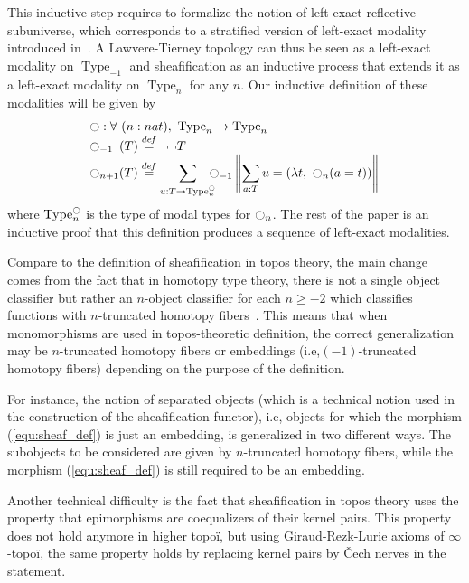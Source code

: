 \documentclass[preprint,9pt,numbers]{sigplanconf}
\newcommand \defeq {\overset{de\hspace{-0.2ex}f}{=}}
\newcommand{\ie}{i.e,\xspace}
\DeclareMathOperator{\Type}{Type}
\newcommand{\modal}{\ensuremath{\ocircle}}
\begin{document}
This inductive step requires to formalize the notion of left-exact
reflective subuniverse, which corresponds to a stratified version of
left-exact modality introduced in~\cite[Chapter~7]{hottbook}. A
Lawvere-Tierney topology can thus be seen as a left-exact modality on
$\Type_{-1}$ and sheafification as an inductive process that extends
it as a left-exact modality on $\Type_{n}$ for any $n$.
Our inductive definition of these modalities will be given by
\[ \begin{array}{l}
   \modal : \forall \ (n : nat), \ \Type_n \to \Type_n 
   \\
    \modal_{-1\phantom{n}}(T) \defeq\lnot\lnot T \\

      \displaystyle{\modal_{n+1}(T)} \defeq  
      \displaystyle{\sum_{u:T \to \Type_n^\modal} \!\!\!\!\modal_{-1} 
      \left\|
      \sum_{a:T} u= (\lambda t,~\modal_n (a=t))
      \right\|}
    \end{array}
\]
where $\Type_n^\modal$ is the type of modal types for $\modal_n$.
The rest of the paper is an inductive proof that this definition produces a
sequence of left-exact modalities.

Compare to the definition of sheafification in topos theory, the main
change comes from the fact that in homotopy type theory, there is not
a single object classifier but rather an $n$-object classifier for
each $n\geq -2$ which classifies functions with $n$-truncated homotopy
fibers~\cite{sets_in_hott}. This means that when monomorphisms are used in topos-theoretic definition, the correct generalization may be $n$-truncated homotopy
fibers or embeddings (\ie $(-1)$-truncated homotopy
fibers) depending on the purpose of the definition.

For instance, the notion of separated objects (which is a technical
notion used in the construction of the sheafification functor), \ie
objects for which the morphism
(\ref{equ:sheaf_def}) is just an embedding, is generalized in two
different ways.  
%
The subobjects to be considered are given by $n$-truncated homotopy fibers,
while the morphism (\ref{equ:sheaf_def}) is still required to be an
embedding.

Another technical difficulty is the fact that sheafification in topos
theory uses the property that epimorphisms are coequalizers of their
kernel pairs. This property does not hold anymore in higher topoï, but
using Giraud-Rezk-Lurie axioms of $\infty$-topoï, the same property
holds by replacing kernel pairs by \v{C}ech nerves in the statement.
\end{document}
